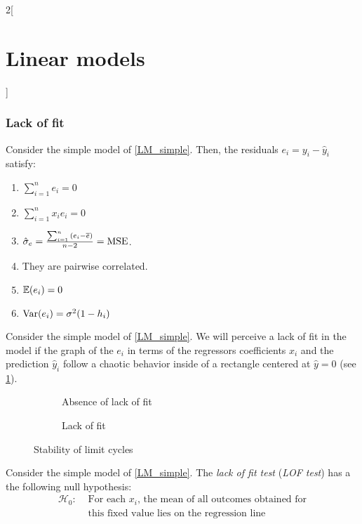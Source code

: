 \documentclass[../../../main_math.tex]{subfiles}
\begin{document}
\begin{multicols}{2}[\section{Linear models}]
  \subsubsection{Lack of fit}
  \begin{definition}
    Consider the simple model of \cref{LM_simple}. Then, the residuals $e_i=y_i-\hat{y}_i$ satisfy:
    \begin{enumerate}
      \item $\sum_{i=1}^ne_i=0$
      \item $\sum_{i=1}^nx_ie_i=0$
      \item $\hat\sigma_e=\frac{\sum_{i=1}^n{(e_i-\overline{e})}}{n-2}=\operatorname{MSE}$.
      \item They are pairwise correlated.
      \item $\mathbb{E}(e_i)= 0$
      \item $\mathrm{Var}(e_i)=\sigma^2(1-h_{i})$
    \end{enumerate}
  \end{definition}
  \begin{proposition}
    Consider the simple model of \cref{LM_simple}. We will perceive a lack of fit in the model if the graph of the $e_i$ in terms of the regressors coefficients $x_i$ and the prediction $\hat{y}_i$ follow a chaotic behavior inside of a rectangle centered at $\hat{y}=0$ (see \cref{LM_lackoffit}).
  \end{proposition}
  \begin{figure}[H]
    \centering
    \begin{subfigure}[b]{0.48\linewidth}
      \centering
      
      \caption{Absence of lack of fit}
    \end{subfigure}
    \hfill
    \begin{subfigure}[b]{0.48\linewidth}
      \centering
      
      \caption{Lack of fit}
    \end{subfigure}
    \caption{Stability of limit cycles}
    \label{LM_lackoffit}
  \end{figure}
  \begin{proposition}
    Consider the simple model of \cref{LM_simple}. The \emph{lack of fit test} (\emph{LOF test}) has a the following null hypothesis:
    \begin{align*}
      \mathcal{H}_0: & \text{ For each $x_i$, the mean of all outcomes obtained for} \\
                     & \text{ this fixed value lies on the regression line}

\end{align*}
\end{proposition}
\end{multicols}
\end{document}
